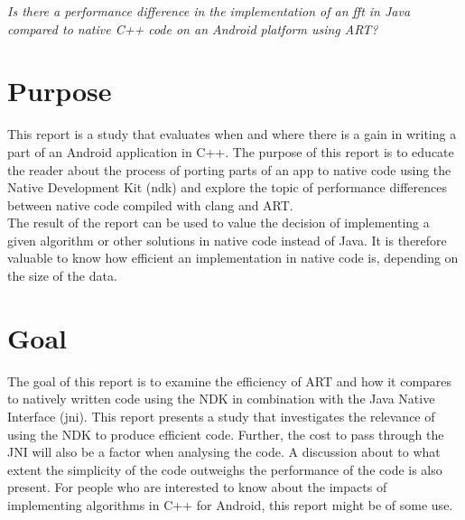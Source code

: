 
\begin{center}
    \textit{Is there a performance difference in the implementation of an \gls{fft} in Java compared to native C++ code on an Android platform using ART?}
\end{center}


\section{Purpose}
This report is a study that evaluates when and where there is a gain in writing a part of an Android application in C++. The purpose of this report is to educate the reader about the process of porting parts of an app to native code using the Native Development Kit (\gls{ndk}) and explore the topic of performance differences between native code compiled with \gls{clang} and ART.\\


The result of the report can be used to value the decision of implementing a given algorithm or other solutions in native code instead of Java.  It is therefore valuable to know how efficient an implementation in native code is, depending on the size of the data.

\section{Goal}
The goal of this report is to examine the efficiency of ART and how it compares to natively written code using the NDK in combination with the Java Native Interface (\gls{jni}). This report presents a study that investigates the relevance of using the NDK to produce efficient code. Further, the cost to pass through the JNI will also be a factor when analysing the code. A discussion about to what extent the simplicity of the code outweighs the performance of the code is also present. For people who are interested to know about the impacts of implementing algorithms in C++ for Android, this report might be of some use.

